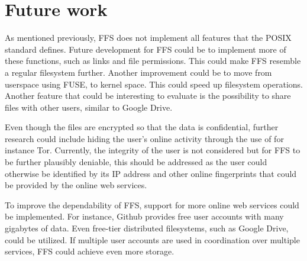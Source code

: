 
\section{Future work}
\label{sec:futureWork}

As mentioned previously, FFS does not implement all features that the POSIX standard defines. Future development for FFS could be to implement more of these functions, such as links and file permissions. This could make FFS resemble a regular filesystem further. Another improvement could be to move from userspace using FUSE, to kernel space. This could speed up filesystem operations. Another feature that could be interesting to evaluate is the possibility to share files with other users, similar to Google Drive.

Even though the files are encrypted so that the data is confidential, further research could include hiding the user's online activity through the use of for instance Tor. Currently, the integrity of the user is not considered but for FFS to be further plausibly deniable, this should be addressed as the user could otherwise be identified by its IP address and other online fingerprints that could be provided by the online web services.

To improve the dependability of FFS, support for more online web services could be implemented. For instance, Github provides free user accounts with many gigabytes of data. Even free-tier distributed filesystems, such as Google Drive, could be utilized. If multiple user accounts are used in coordination over multiple services, FFS could achieve even more storage.




